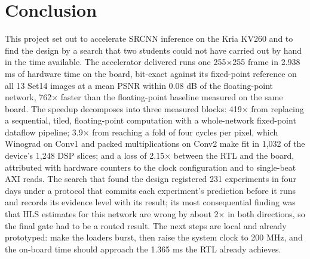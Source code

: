 \section{Conclusion}\label{sec:7}

This project set out to accelerate SRCNN inference on the Kria KV260 and to find the design by a search that two students could not have carried out by hand in the time available. The accelerator delivered runs one 255$\times$255 frame in 2.938 ms of hardware time on the board, bit-exact against its fixed-point reference on all 13 Set14 images at a mean PSNR within 0.08 dB of the floating-point network, 762$\times$ faster than the floating-point baseline measured on the same board. The speedup decomposes into three measured blocks: 419$\times$ from replacing a sequential, tiled, floating-point computation with a whole-network fixed-point dataflow pipeline; 3.9$\times$ from reaching a fold of four cycles per pixel, which Winograd on Conv1 and packed multiplications on Conv2 make fit in 1,032 of the device's 1,248 DSP slices; and a loss of 2.15$\times$ between the RTL and the board, attributed with hardware counters to the clock configuration and to single-beat AXI reads. The search that found the design registered 231 experiments in four days under a protocol that commits each experiment's prediction before it runs and records its evidence level with its result; its most consequential finding was that HLS estimates for this network are wrong by about 2$\times$ in both directions, so the final gate had to be a routed result. The next steps are local and already prototyped: make the loaders burst, then raise the system clock to 200 MHz, and the on-board time should approach the 1.365 ms the RTL already achieves.
